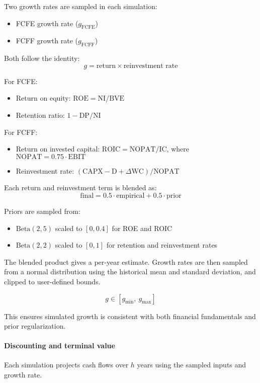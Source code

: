 Two growth rates are sampled in each simulation:
\begin{itemize}
  \item FCFE growth rate ($g_{\text{FCFE}}$)
  \item FCFF growth rate ($g_{\text{FCFF}}$)
\end{itemize}

Both follow the identity:
\[
g = \text{return} \times \text{reinvestment rate}
\]

For FCFE:
\begin{itemize}
  \item Return on equity: $\text{ROE} = \text{NI} / \text{BVE}$
  \item Retention ratio: $1 - \text{DP} / \text{NI}$
\end{itemize}

For FCFF:
\begin{itemize}
  \item Return on invested capital: $\text{ROIC} = \text{NOPAT} / \text{IC}$, where $\text{NOPAT} = 0.75 \cdot \text{EBIT}$
  \item Reinvestment rate: $(\text{CAPX} - \text{D} + \Delta \text{WC}) / \text{NOPAT}$
\end{itemize}

Each return and reinvestment term is blended as:
\[
\text{final} = 0.5 \cdot \text{empirical} + 0.5 \cdot \text{prior}
\]

Priors are sampled from:
\begin{itemize}
  \item $\text{Beta}(2, 5)$ scaled to $[0, 0.4]$ for ROE and ROIC
  \item $\text{Beta}(2, 2)$ scaled to $[0, 1]$ for retention and reinvestment rates
\end{itemize}

The blended product gives a per-year estimate. Growth rates are then sampled from a normal distribution using the historical mean and standard deviation, and clipped to user-defined bounds.

\[
g \in [g_{\text{min}},\ g_{\text{max}}]
\]

This ensures simulated growth is consistent with both financial fundamentals and prior regularization.


\paragraph{Discounting and terminal value}

Each simulation projects cash flows over $h$ years using the sampled inputs and growth rate.

